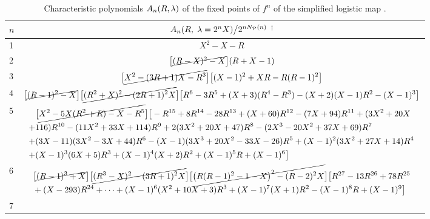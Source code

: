 \documentclass[twocolumn]{revtex4-1}
\begin{document}
\begin{table*}[t]\footnotesize
  \caption{
  Characteristic polynomials $A_n(R, \lambda)$ of
  the fixed points of $f^n$ of
  the simplified logistic map .
  }
\begin{center}
\begin{tabular}{lc}
\hline
  $n$
& $A_n(R, \; \lambda = 2^n X)
  \big\slash
   2^{n N_\mathcal P(n)}$ $^\dagger$
\\
\hline
1
&
$X^2-X-R$
\\
2
&
  $
  \big[ \cancel{(R-X)^2 - X}\big]
  (R + X - 1)
  $
\\
3
&
$\begin{aligned}
\big[\cancel{
  X^2-(3R+1)X-R^3
}\big]
  \big[
  (X-1)^2
 + X R
 - R(R-1)^2
  \big]
\end{aligned}$
\\
4
&
$\begin{aligned}
\big[ \cancel{
  (R-1)^2 - X
} \big]
\big[ \cancel{
(R^2+X)^2 -(2R+1)^2 X
} \big]
\big[
  R^6-3 R^5+(X+3) (R^4 - R^3) -(X+2)(X-1) R^2 - (X-1)^3
\big]
\end{aligned}$
\\
5
&
\begin{minipage}{.97\linewidth}
\vspace*{2mm}
$\begin{aligned}
&\big[ \cancel{
  X^2-5 X (R^2+R)-X - R^5
} \big]
\big[
-R^{15}+8 R^{14}-28 R^{13}+(X+60) R^{12}-(7 X+94) R^{11}
+(3 X^2 +20 X
\\
+&116) R^{10}
-(11 X^2+33 X+114) R^9
+2(3 X^2+20 X+47) R^8
-(2 X^3-20 X^2+37 X+69) R^7 \\
+&(3 X-11)(3X^2-3X+44) R^6
-(X-1) (3 X^3+20 X^2-33 X-26) R^5
+(X-1)^2 (3 X^2+27 X+14) R^4 \\
+&(X-1)^3 (6 X+5) R^3
+(X-1)^4 (X+2) R^2+(X-1)^5 R+(X-1)^6
\big]
\end{aligned}$
\vspace{1mm}
\end{minipage}
\\
6
&
$\begin{aligned}
&\big[\cancel {
  (R-1)^3 + X
}\big]
\big[\cancel {
 (R^3 - X)^2 - (3R+1)^2 X
}\big]
\big[\cancel {
\big(R(R-1)^2-1-X\big)^2-(R-2)^2 X
}\big]
\big[
R^{27}-13 R^{26}+78 R^{25}\\
&+(X-293) R^{24}
+\dots
+(X-1)^6 (X^2+10 X+3) R^3
+(X-1)^7 (X+1) R^2-(X-1)^8 R+(X-1)^9
\big]
\end{aligned}$
\\
7
&
\begin{minipage}{.97\linewidth}

\end{minipage}
\end{tabular}
\end{center}
\end{table*}
\end{document}

